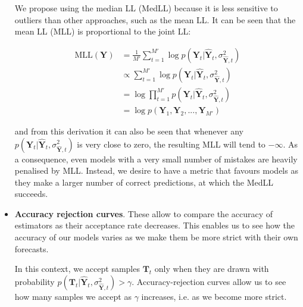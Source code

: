 \documentclass[pdftex,10pt,a4paper,journal]{article}
\theoremstyle{definition}
\theoremstyle{remark}
\newcommand*{\V}[1]{\mathbf{#1}}%
\begin{document}
\begin{multicols}{2}
\begin{itemize}
    We propose using the median LL (MedLL) because it is less sensitive to outliers than other approaches, such as the mean LL. It can be seen that the mean LL (MLL) is proportional to the joint LL:
    
    \begin{align*}
        \text{MLL}(\V{Y}) &= \frac{1}{M'}\sum_{t=1}^{M'}\log{p(\V{Y}_t | \V{\hat{Y}}_{t}, \sigma^2_{\V{\hat{Y}}, t})} \\
        &\propto \sum_{t=1}^{M'}\log{p(\V{Y}_t | \V{\hat{Y}}_{t}, \sigma^2_{\V{\hat{Y}}, t})} \\
        &= \log{\prod_{t=1}^{M'}p(\V{Y}_t | \V{\hat{Y}}_{t}, \sigma^2_{\V{\hat{Y}}, t})}\\
        &= \log{p(\V{Y}_1, \V{Y}_2, ..., \V{Y}_{M'})}
    \end{align*}
    
    and from this derivation it can also be seen that whenever any $p(\V{Y}_t | \V{\hat{Y}}_{t}, \sigma^2_{\V{\hat{Y}}, t})$ is very close to zero, the resulting MLL will tend to $-\infty$. As a consequence, even models with a very small number of mistakes are heavily penalised by MLL. Instead, we desire to have a metric that favours models as they make a larger number of correct predictions, at which the MedLL succeeds.
    
    \item \textbf{Accuracy rejection curves}. These allow to compare the accuracy of estimators as their acceptance rate decreases. This enables us to see how the accuracy of our models varies as we make them be more strict with their own forecasts.
    
    \par In this context, we accept samples $\V{T}_t$ only when they are drawn with probability $p(\V{T}_t | \V{\hat{Y}}_{t}, \sigma^2_{\V{\hat{Y}}, t}) > \gamma$. Accuracy-rejection curves allow us to see how many samples we accept as $\gamma$ increases, i.e. as we become more strict. 
    

\end{itemize}
\end{multicols}
\end{document}
